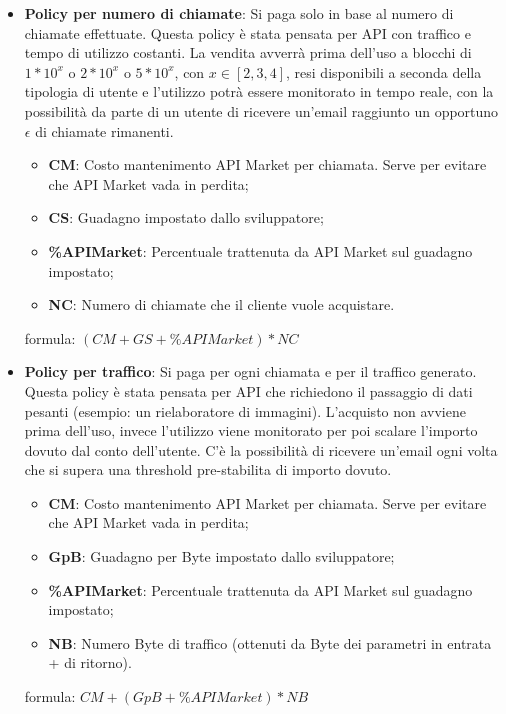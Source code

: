 \begin{itemize}
	\item \textbf{Policy per numero di chiamate}: Si paga solo in base al numero di chiamate effettuate.
Questa policy \`{e} stata pensata per API con traffico e tempo di utilizzo costanti. La vendita avverr\`{a} prima dell'uso a blocchi di $1*10^x$ o $2*10^x$ o $5*10^x$, con $x \in [2,3,4]$, resi disponibili a seconda della tipologia di utente e l'utilizzo potr\`{a} essere monitorato in tempo reale, con la possibilit\`{a} da parte di un utente di ricevere un'email raggiunto un opportuno $\epsilon$ di chiamate rimanenti.
	
	\begin{itemize}
		\item \textbf{CM}: Costo mantenimento API Market per chiamata. Serve per evitare che API Market vada in perdita;
		\item \textbf{CS}: Guadagno impostato dallo sviluppatore;
		\item \textbf{\%APIMarket}: Percentuale trattenuta da API Market sul guadagno impostato;
		\item \textbf{NC}: Numero di chiamate che il cliente vuole acquistare.
	\end{itemize}
	formula: $(CM + GS + \%APIMarket) * NC
$

	\item \textbf{Policy per traffico}: Si paga per ogni chiamata e per il traffico generato.
Questa policy \`{e} stata pensata per API che richiedono il passaggio di dati pesanti (esempio: un rielaboratore di immagini). L'acquisto non avviene prima dell'uso, invece l'utilizzo viene monitorato per poi scalare l'importo dovuto dal conto dell'utente. C'\`{e} la possibilit\`{a} di ricevere un'email ogni volta che si supera una threshold pre-stabilita di importo dovuto.
	
	\begin{itemize}
		\item \textbf{CM}: Costo mantenimento API Market per chiamata. Serve per evitare che API Market vada in perdita;
		\item \textbf{GpB}: Guadagno per Byte impostato dallo sviluppatore;
		\item \textbf{\%APIMarket}: Percentuale trattenuta da API Market sul guadagno impostato;
		\item \textbf{NB}: Numero Byte di traffico (ottenuti da Byte dei parametri in entrata + di ritorno).
	\end{itemize}
	formula: $CM + (GpB + \%APIMarket) * NB
$
	

\end{itemize}
